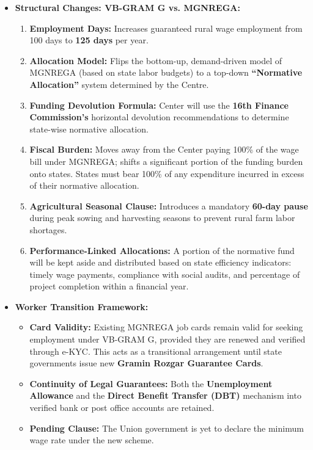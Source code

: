 \begin{itemize}
    \item \textbf{Structural Changes: VB-GRAM G vs. MGNREGA:}
    \begin{enumerate}
        \item \textbf{Employment Days:} Increases guaranteed rural wage employment from 100 days to \textbf{125 days} per year.
        \item \textbf{Allocation Model:} Flips the bottom-up, demand-driven model of MGNREGA (based on state labor budgets) to a top-down \textbf{“Normative Allocation”} system determined by the Centre.
        \item \textbf{Funding Devolution Formula:} Center will use the \textbf{16th Finance Commission's} horizontal devolution recommendations to determine state-wise normative allocation.
        \item \textbf{Fiscal Burden:} Moves away from the Center paying 100\% of the wage bill under MGNREGA; shifts a significant portion of the funding burden onto states. States must bear 100\% of any expenditure incurred in excess of their normative allocation.
        \item \textbf{Agricultural Seasonal Clause:} Introduces a mandatory \textbf{60-day pause} during peak sowing and harvesting seasons to prevent rural farm labor shortages.
        \item \textbf{Performance-Linked Allocations:} A portion of the normative fund will be kept aside and distributed based on state efficiency indicators: timely wage payments, compliance with social audits, and percentage of project completion within a financial year.
    \end{enumerate}

    \item \textbf{Worker Transition Framework:}
    \begin{itemize}
        \item \textbf{Card Validity:} Existing MGNREGA job cards remain valid for seeking employment under VB-GRAM G, provided they are renewed and verified through e-KYC. This acts as a transitional arrangement until state governments issue new \textbf{Gramin Rozgar Guarantee Cards}.
        \item \textbf{Continuity of Legal Guarantees:} Both the \textbf{Unemployment Allowance} and the \textbf{Direct Benefit Transfer (DBT)} mechanism into verified bank or post office accounts are retained.
        \item \textbf{Pending Clause:} The Union government is yet to declare the minimum wage rate under the new scheme.
    \end{itemize}


\end{itemize}
